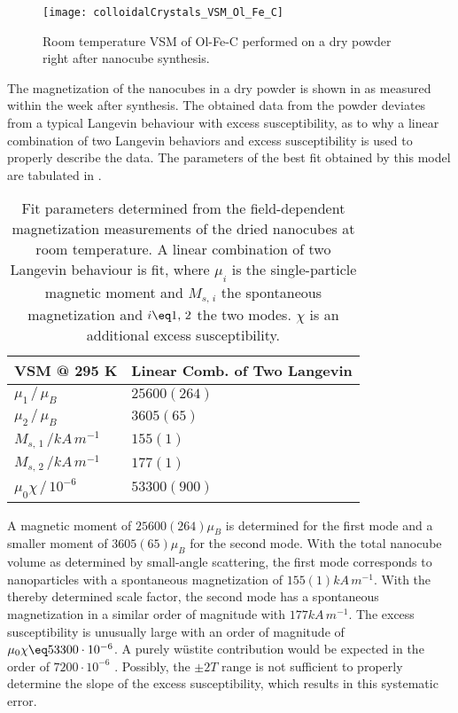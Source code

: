 \documentclass[\main/dresen_thesis.tex]{subfiles}
\begin{document}
  \label{sec:colloidalCrystals:nanoparticle:vsm}
  \begin{figure}[tb]
    \centering
    \texttt{[image: colloidalCrystals\_VSM\_Ol\_Fe\_C]}
    \caption{\label{fig:colloidalCrystals:nanoparticle:vsm}Room temperature VSM of Ol-Fe-C performed on a dry powder right after nanocube synthesis.}
  \end{figure}
  The magnetization of the nanocubes in a dry powder is shown in  as measured within the week after synthesis.
  The obtained data from the powder deviates from a typical Langevin behaviour with excess susceptibility, as to why a linear combination of two Langevin behaviors and excess susceptibility is used to properly describe the data.
  The parameters of the best fit obtained by this model are tabulated in .

  \begin{table}[!htbp]
    \centering
    \caption{\label{tab:colloidalCrystals:nanoparticle:vsm} Fit parameters determined from the field-dependent magnetization measurements of the dried nanocubes at room temperature. A linear combination of two Langevin behaviour is fit, where $\mu_i$ is the single-particle magnetic moment and $M_{s,\,i}$ the spontaneous magnetization and $i\eq 1,\,2$ the two modes. $\chi$ is an additional excess susceptibility.}
    \begin{tabular}{ l | l }
      \rule{0pt}{2ex} \textbf{VSM @ 295 K} & Linear Comb. of Two Langevin \\
      \hline
      \rule{0pt}{2ex} $\mu_1 \, / \, \mu_B$                     & $25600(264)$\\
      \rule{0pt}{2ex} $\mu_2 \, / \, \mu_B$                     & $3605(65) $ \\
      \rule{0pt}{2ex} $M_{s,\,1} \, /  \unit{kA\,m^{-1}}$       & $155(1)$    \\
      \rule{0pt}{2ex} $M_{s,\,2} \, /  \unit{kA\,m^{-1}}$       & $177(1)$    \\
      \rule{0pt}{2ex} $\mu_0 \chi \, / \, 10^{-6}$              & $53300(900)$\\
      \hline
    \end{tabular}
  \end{table}

  A magnetic moment of $25600(264) \mu_B$ is determined for the first mode and a smaller moment of $3605(65) \mu_B$ for the second mode.
  With the total nanocube volume as determined by small-angle scattering, the first mode corresponds to nanoparticles with a spontaneous magnetization of $155(1) \unit{kA \, m^{-1}}$.
  With the thereby determined scale factor, the second mode has a spontaneous magnetization in a similar order of magnitude with $177 \unit{kA \, m^{-1}}$.
  The excess susceptibility is unusually large with an order of magnitude of $\mu_0 \chi \eq 53300 \cdot 10^{-6}$.
  A purely w\"ustite contribution would be expected in the order of $7200 \cdot 10^{-6}$ \cite{Lide_2004_Handb}.
  Possibly, the $\pm 2 \unit{T}$ range is not sufficient to properly determine the slope of the excess susceptibility, which results in this systematic error.
\end{document}
